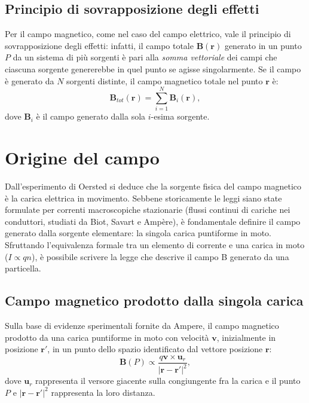 \documentclass[a4paper,11pt]{report}
\begin{document}
\subsection{Principio di sovrapposizione degli effetti}
Per il campo magnetico, come nel caso del campo elettrico, vale il principio di sovrapposizione degli effetti: infatti, il campo totale $\bm{B}(\bm{r})$ generato in un punto $P$ da un sistema di più sorgenti è pari alla \textit{somma vettoriale} dei campi che ciascuna sorgente genererebbe in quel punto se agisse singolarmente.
Se il campo è generato da $N$ sorgenti distinte, il campo magnetico totale nel punto $\bm{r}$ è:
\begin{equation}
    \bm{B}_{tot}(\bm{r}) = \sum_{i=1}^{N} \bm{B}_i(\bm{r}),
\end{equation}
dove $\bm{B}_i$ è il campo generato dalla sola $i$-esima sorgente.
    
  \section{Origine del campo}
Dall'esperimento di Oersted si deduce che la sorgente fisica del campo magnetico è la carica elettrica in movimento. Sebbene storicamente le leggi siano state formulate per correnti macroscopiche stazionarie (flussi continui di cariche nei conduttori, studiati da Biot, Savart e Ampère), è fondamentale definire il campo generato dalla sorgente elementare: la singola carica puntiforme in moto. Sfruttando l'equivalenza formale tra un elemento di corrente e una carica in moto ($I \propto qn$), è possibile scrivere la legge che descrive il campo B generato da una particella.

\subsection{Campo magnetico prodotto dalla singola carica}
Sulla base di evidenze sperimentali fornite da Ampere, il campo magnetico prodotto da una carica puntiforme in moto con velocità $\bm{v}$, inizialmente in posizione $\bm{r}'$, in un punto dello spazio identificato dal vettore posizione $\bm{r}$:
\begin{equation}
\bm{B}(P) \propto \frac{q\bm{v} \times \bm{u}_r}{|\bm{r}-\bm{r}'|^2},
\end{equation}
dove $\bm{u}_r$ rappresenta il versore giacente sulla congiungente fra la carica e il punto $P$ e $|\bm{r}-\bm{r}'|^2$ rappresenta la loro distanza. 
\end{document}
